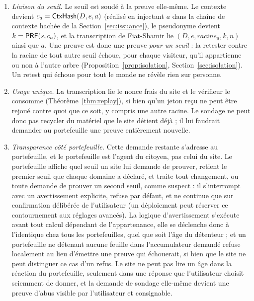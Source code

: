 \documentclass[11pt]{article}
\theoremstyle{definition}
\begin{document}
\begin{enumerate}[leftmargin=2em]
\item \emph{Liaison du seuil.} Le seuil est soudé à la preuve elle-même. Le contexte
devient $c_a = \mathsf{CtxHash}(D, e, a)$ (réalisé en injectant $a$ dans la chaîne de contexte
hachée de la Section~\ref{sec:issuance}), le pseudonyme devient $k = \mathsf{PRF}(s, c_a)$, et la
transcription de Fiat-Shamir lie $(D, e, \mathit{racine}_a, k, n)$ ainsi que $a$. Une
preuve est donc une preuve \emph{pour un seuil} : la retester contre la racine de tout
autre seuil échoue, pour chaque visiteur, qu'il appartienne ou non à l'autre arbre
(Proposition~\ref{prop:isolation}, Section~\ref{sec:isolation}). Un retest qui échoue
pour tout le monde ne révèle rien sur personne.
\item \emph{Usage unique.} La transcription lie le nonce frais du site et le vérifieur le
consomme (Théorème~\ref{thm:replay}), si bien qu'un jeton reçu ne peut être rejoué contre
quoi que ce soit, y compris une autre racine. Le sondage ne peut donc pas recycler du
matériel que le site détient déjà ; il lui faudrait demander au portefeuille une preuve
entièrement nouvelle.
\item \emph{Transparence côté portefeuille.} Cette demande restante s'adresse au
portefeuille, et le portefeuille est l'agent du citoyen, pas celui du site. Le
portefeuille affiche quel seuil un site lui demande de prouver, retient le premier seuil
que chaque domaine a déclaré, et traite tout changement, ou toute demande de prouver un
second seuil, comme suspect : il s'interrompt avec un avertissement explicite, refuse par
défaut, et ne continue que sur confirmation délibérée de l'utilisateur (un déploiement
peut réserver ce contournement aux réglages avancés). La logique d'avertissement
s'exécute avant tout calcul dépendant de l'appartenance, elle se déclenche donc à
l'identique chez tous les portefeuilles, quel que soit l'âge du détenteur ; et un
portefeuille ne détenant aucune feuille dans l'accumulateur demandé refuse localement au
lieu d'émettre une preuve qui échouerait, si bien que le site ne peut distinguer ce cas
d'un refus. Le site ne
peut pas lire un âge dans la réaction du portefeuille, seulement dans une réponse que
l'utilisateur choisit sciemment de donner, et la demande de sondage elle-même devient une
preuve d'abus visible par l'utilisateur et consignable.
\end{enumerate}
\end{document}
